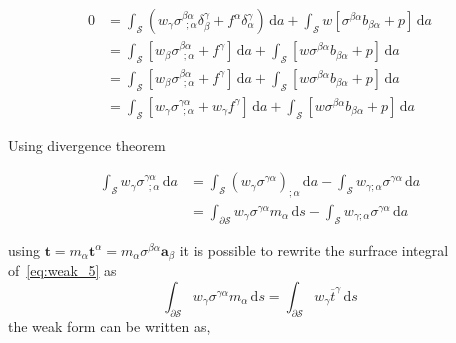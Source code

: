         \begin{equation}\label{eq:weak_4}
        \begin{split}
                0 &= \int_{\mathcal{S}} \left( w_{\gamma} \sigma^{\beta \alpha}_{~~; \alpha} \delta^{\gamma}_{\beta} + f^{\alpha} \delta^{\gamma}_{\alpha} \right) \, \mathrm{d} a + \int_{\mathcal{S}} w \left[ \sigma^{\beta \alpha} b_{\beta \alpha} + p \right] \, \mathrm{d} a \\ &= \int_{\mathcal{S}} \left[ w_{\beta} \sigma^{\beta \alpha}_{~~; \alpha} + f^{\gamma} \right] \, \mathrm{d} a + \int_{\mathcal{S}} \left[ w \sigma^{\beta \alpha} b_{\beta \alpha} +  p \right] \, \mathrm{d} a  \\ &= \int_{\mathcal{S}} \left[ w_{\beta} \sigma^{\beta \alpha}_{~~; \alpha} + f^{\gamma} \right] \, \mathrm{d} a + \int_{\mathcal{S}} \left[ w \sigma^{\beta \alpha} b_{\beta \alpha} + p \right] \, \mathrm{d} a \\ &= \int_{\mathcal{S}} \left[ w_{\gamma} \sigma^{\gamma \alpha}_{~~; \alpha} + w_{\gamma} f^{\gamma} \right] \, \mathrm{d} a + \int_{\mathcal{S}} \left[ w \sigma^{\beta \alpha} b_{\beta \alpha} + p \right] \, \mathrm{d} a
            \end{split}
        \end{equation}
        
        Using divergence theorem
        
        \begin{equation}\label{eq:weak_5}
            \begin{split}
                \int_{\mathcal{S}} w_{\gamma} \sigma^{\gamma \alpha}_{~~; \alpha} \, \mathrm{d} a &= \int_{\mathcal{S}} \left( w_{\gamma} \sigma^{\gamma \alpha} \right)_{; \alpha} \, \mathrm{d} a - \int_{\mathcal{S}} w_{\gamma ; \alpha} \sigma^{\gamma \alpha} \, \mathrm{d} a \\ &= \int_{\partial \mathcal{S}} w_{\gamma} \sigma^{\gamma \alpha} m_{\alpha} \, \mathrm{d} s - \int_{\mathcal{S}} w_{\gamma ; \alpha} \sigma^{\gamma \alpha} \, \mathrm{d} a
            \end{split}
        \end{equation}
        
        using $ \boldsymbol{t} = m_{\alpha} \boldsymbol{t}^{\alpha} = m_{\alpha} \sigma^{\beta \alpha} \boldsymbol{a}_{\beta} $ it is possible to rewrite the surfrace integral of~\eqref{eq:weak_5} as
\begin{equation}\label{eq:weak_6}
    \int_{\partial \mathcal{S}} w_{\gamma} \sigma^{\gamma \alpha} m_{\alpha} \, \mathrm{d} s = \int_{\partial \mathcal{S}} w_{\gamma} \overline{t}^{\gamma} \, \mathrm{d} s
\end{equation}
the weak form can be written as,
    
